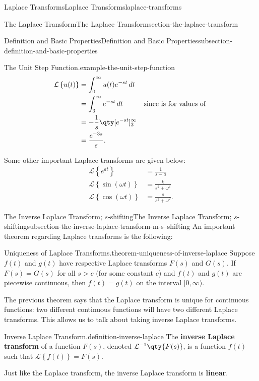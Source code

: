 \documentclass[oneside,10pt,]{book}
\newcommand{\terminology}[1]{\textbf{#1}}
\numberwithin{equation}{section}
\newcommand{\Int}[2]{\int_{#1}^{#2}}
\newcommand{\Laplace}[1]{\mathcal{L}\left\{#1\right\}}
\newcommand{\gt}{>}
\newcommand{\amp}{&}
\begin{document}
\begin{chapterptx}{Laplace Transforms}{}{Laplace Transforms}{}{}{laplace-transforms}
\begin{sectionptx}{The Laplace Transform}{}{The Laplace Transform}{}{}{section-the-laplace-transform}
\begin{subsectionptx}{Definition and Basic Properties}{}{Definition and Basic Properties}{}{}{subsection-definition-and-basic-properties}
\begin{example}{The Unit Step Function.}{example-the-unit-step-function}
\begin{align*}
\Laplace{u(t)} \amp= \Int{0}{\infty}u(t)e^{-st}\,dt\\
\amp= \Int{3}{\infty}e^{-st}\,dt \amp\text{since  is  for values of }\\
\amp= -\frac{1}{s}\qty[e^{-st}]_{3}^{\infty}\\
\amp= \frac{e^{-3s}}{s}\text{.}
\end{align*}
%
\end{example}
\hypertarget{p-502}{}%
Some other important Laplace transforms are given below:%
\begin{align*}
\Laplace{e^{at}} \amp= \frac{1}{s-a}\\
\Laplace{\sin(\omega t)} \amp= \frac{k}{s^{2}+\omega^{2}}\\
\Laplace{\cos(\omega t)} \amp= \frac{s}{s^{2}+\omega^{2}}\text{.}
\end{align*}
%
\end{subsectionptx}
%
%
\typeout{************************************************}
\typeout{************************************************}
%
\begin{subsectionptx}{The Inverse Laplace Transform; \(s\)-shifting}{}{The Inverse Laplace Transform; \(s\)-shifting}{}{}{subsection-the-inverse-laplace-transform-m-s--shifting}
\hypertarget{p-503}{}%
An important theorem regarding Laplace transforms is the following:%
\begin{theorem}{Uniqueness of Laplace Transforms.}{}{theorem-uniqueness-of-inverse-laplace}%
\hypertarget{p-504}{}%
Suppose \(f(t)\) and \(g(t)\) have respective Laplace transforms \(F(s)\) and \(G(s)\). If \(F(s) = G(s)\) for all \(s\gt c\) (for some constant \(c\)) and \(f(t)\) and \(g(t)\) are piecewise continuous, then \(f(t) = g(t)\) on the interval \([0,\infty)\).%
\end{theorem}
\hypertarget{p-505}{}%
The previous theorem says that the Laplace transform is unique for continuous functions: two different continuous functions will have two different Laplace transforms. This allows us to talk about taking inverse Laplace transforms.%
\begin{definition}{Inverse Laplace Transform.}{definition-inverse-laplace}%
\hypertarget{p-506}{}%
The \terminology{inverse Laplace transform} of a function \(F(s)\), denoted \(\mathcal{L}^{-1}\qty{F(s)}\), is a function \(f(t)\) such that \(\Laplace{f(t)} = F(s)\).%
\end{definition}
\hypertarget{p-507}{}%
Just like the Laplace transform, the inverse Laplace transform is \terminology{linear}.%

\end{subsectionptx}
\end{sectionptx}
\end{chapterptx}
\end{document}
